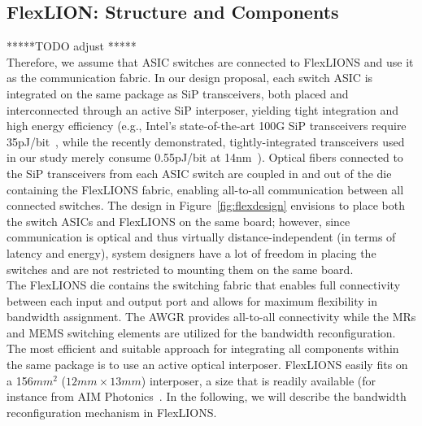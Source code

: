 \subsection{FlexLION: Structure and Components}
*****TODO adjust *****\\
Therefore, we assume that ASIC switches are connected to FlexLIONS and use it as the communication fabric. In our design proposal, each switch ASIC is integrated on the same package as SiP transceivers, both placed and interconnected through an active SiP interposer, yielding tight integration and high energy efficiency (e.g., Intel's state-of-the-art 100G SiP transceivers require 35pJ/bit~\cite{intelsip}, while the recently demonstrated, tightly-integrated transceivers used in our study merely consume 0.55pJ/bit at 14nm~\cite{li201525}). Optical fibers connected to the SiP transceivers from each ASIC switch are coupled in and out of the die containing the FlexLIONS fabric, enabling all-to-all communication between all connected switches. The design in Figure~\ref{fig:flexdesign} envisions to place both the switch ASICs and FlexLIONS on the same board; however, since communication is optical and thus virtually distance-independent (in terms of latency and energy), system designers have a lot of freedom in placing the switches and are not restricted to mounting them on the same board.  \\
The FlexLIONS die contains the switching fabric that enables full connectivity between each input and output port and allows for maximum flexibility in bandwidth assignment. The AWGR provides all-to-all connectivity while the MRs and MEMS switching elements are utilized for the bandwidth reconfiguration. The most efficient and suitable approach for integrating all components within the same package is to use an active optical interposer. FlexLIONS easily fits on a 156$mm^2$ ($12mm \times 13mm$) interposer, a size that is readily available (for instance from AIM Photonics~\cite{aim}. In the following, we will describe the bandwidth reconfiguration mechanism in FlexLIONS. 

